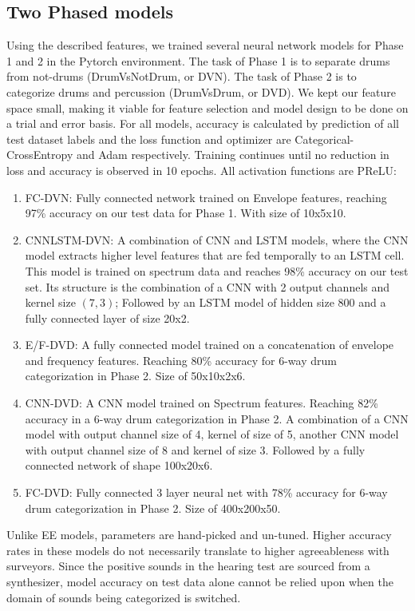 \documentclass[runningheads,a4paper]{llncs}
\begin{document}
\begin{appendices}
\section{Two Phased models}
Using the described features, we trained several neural network models for Phase 1 and 2 in the Pytorch environment. The task of Phase 1 is to separate drums from not-drums (DrumVsNotDrum, or DVN). The task of Phase 2 is to categorize drums and percussion (DrumVsDrum, or DVD). We kept our feature space small, making it viable for feature selection and model design to be done on a trial and error basis. For all models, accuracy is calculated by prediction of all test dataset labels and the loss function and optimizer are Categorical-CrossEntropy and Adam respectively. Training continues until no reduction in loss and accuracy is observed in 10 epochs.  All activation functions are PReLU:
\begin {enumerate}
\item FC-DVN: Fully connected network trained on Envelope features, reaching 97\% accuracy on our test data for Phase 1. With size of 10x5x10.
\item CNNLSTM-DVN: A combination of CNN and LSTM models, where the CNN model extracts higher level features that are fed temporally to an LSTM cell. This model is trained on spectrum data and reaches 98\% accuracy on our test set. Its structure is the combination of a CNN with 2 output channels and kernel size $(7,3)$; Followed by an LSTM model of hidden size 800 and a fully connected layer of size 20x2.
\item E/F-DVD: A fully connected model trained on a concatenation of envelope and frequency features. Reaching 80\% accuracy for 6-way drum categorization in Phase 2. Size of 50x10x2x6.
\item CNN-DVD: A CNN model trained on Spectrum features. Reaching 82\% accuracy in a 6-way drum categorization in Phase 2. A combination of a CNN model with output channel size of 4, kernel of size of 5, another CNN model with output channel size of 8 and kernel of size 3. Followed by a fully connected network of shape 100x20x6.
\item FC-DVD: Fully connected 3 layer neural net with 78\% accuracy for 6-way drum categorization in Phase 2. Size of 400x200x50.
\end{enumerate}
Unlike EE models, parameters are hand-picked and un-tuned. Higher accuracy rates in these models do not necessarily translate to higher agreeableness with surveyors. Since the positive sounds in the hearing test are sourced from a synthesizer, model accuracy on test data alone cannot be relied upon when the domain of sounds 
being categorized is switched.


\end{appendices}
\end{document}

